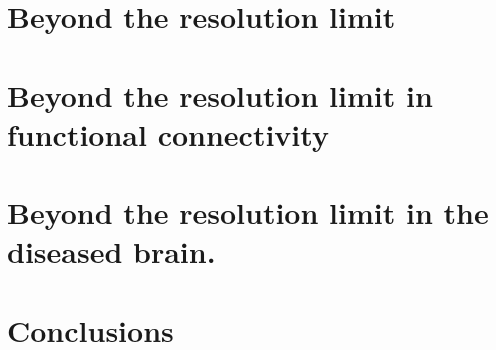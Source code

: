 \chapter{Beyond the resolution limit}\label{chap:beyondresolutionlimit}


\chapter{Beyond the resolution limit in functional connectivity}


\chapter{Beyond the resolution limit in the diseased brain.}


\chapter{Conclusions}\label{chap:conclusions}







% 
% 

%
